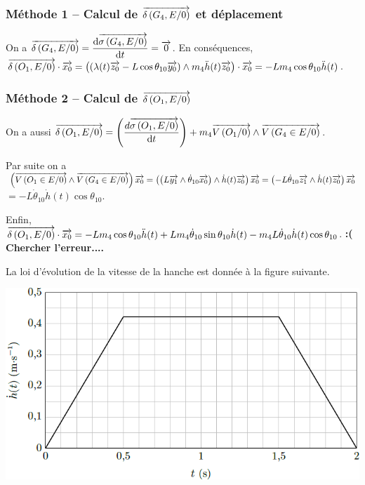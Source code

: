 \documentclass[10pt,fleqn]{article} %
\begin{document}
\begin{multicols}{2}
\ifprof
\begin{corrige}
\subsubsection*{Méthode 1 -- Calcul de $\overrightarrow{\delta \left( {G_4}, {E} /{0}\right)}$ et déplacement}
On a $\overrightarrow{\delta \left( {G_4}, {E} /{0}\right)}= \dfrac{\text{d} \overrightarrow{\sigma \left( {G_4}, {E} /{0}\right)}}{\text{d} t}= \overrightarrow{0}$. En conséquences, 
$ \overrightarrow{\delta \left( {O_1}, {E} /{0}\right)}\cdot \overrightarrow{x_0} 
= \left(\left( \lambda(t)\overrightarrow{z_0}-L\cos\theta_{10}\overrightarrow{y_0}\right)\wedge m_4\ddot{h}(t)\overrightarrow{z_0}\right) \cdot \overrightarrow{x_0} =  -Lm_4\cos\theta_{10}\ddot{h}(t)$.

\subsubsection*{Méthode 2 -- Calcul de $\overrightarrow{\delta \left( {O_1}, {E} /{0}\right)}$}
On a aussi $\overrightarrow{\delta \left( {O_1}, {E} /{0}\right)} = \left(\dfrac{d \overrightarrow{\sigma \left( {O_1}, {E} /{0}\right)}}{\text{d} t}\right)+m_4\overrightarrow{V\left(O_1/0\right)}\wedge\overrightarrow{V\left( {G_4} \in {E}/{0}\right)} $. 

Par suite on a 
$\left(\overrightarrow{V\left( {O_1} \in {E}/{0}\right)}\wedge\overrightarrow{V\left( {G_4} \in {E}/{0}\right)}\right)\overrightarrow{x_0}=
\left(\left( L\overrightarrow{y_1}\wedge \dot{\theta}_{10} \overrightarrow{x_0} \right) \wedge\dot{h}(t)\overrightarrow{z_0}\right)\overrightarrow{x_0} 
= \left( -L\dot{\theta}_{10} \overrightarrow{z_1} \wedge\dot{h}(t)\overrightarrow{z_0}\right)\overrightarrow{x_0} $ 
$= -L\dot{\theta}_{10} \dot{h}(t) \cos \theta_{10} $. 

Enfin, 
 $\overrightarrow{\delta \left( {O_1}, {E} /{0}\right)}\cdot\overrightarrow{x_0}=-Lm_4\cos\theta_{10}\ddot{h}(t)+Lm_4\dot{\theta}_{10}\sin\theta_{10}\dot{h}(t)-m_4L\dot{\theta}_{10} \dot{h}(t) \cos \theta_{10}$.
\textbf{ :( Chercher l'erreur....}

 
\end{corrige}
\else
\fi

La loi d'évolution de la vitesse de la hanche est donnée à la figure suivante. 

\begin{center}
\includegraphics[width=\linewidth]{images/fig_11}
\end{center}



\end{multicols}
\end{document}
